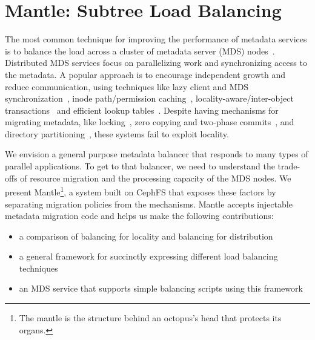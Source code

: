 \chapter{Mantle: Subtree Load Balancing}
\label{chp:mantle}

The most common technique for improving the performance of metadata services is
to balance the load across a cluster of metadata server (MDS)
nodes~\cite{patil:fast2011-giga+, weil:osdi2006-ceph, weil:sc2004-dyn-metadata,
sinnamohideen:atc2010-ursa, xing:sc2009-skyfs}.  Distributed MDS services focus
on parallelizing work and synchronizing access to the metadata. A popular
approach is to encourage independent growth and reduce communication, using
techniques like lazy client and MDS synchronization~\cite{patil:fast2011-giga+,
ren:sc2014-indexfs, zheng:pdsw2014-batchfs, hildebrand:msst2005-pnfs,
zhu:pds2008-hba}, inode path/permission caching~\cite{brandt:mss2003-lh,
li:msst2006-dynamic, xing:sc2009-skyfs}, locality-aware/inter-object
transactions~\cite{sinnamohideen:atc2010-ursa,zhu:pds2008-hba,ren:atc2013-tablefs,
ren:sc2014-indexfs} and efficient lookup tables~\cite{brandt:mss2003-lh,
zhu:pds2008-hba}. Despite having mechanisms for migrating metadata, like
locking~\cite{sinnamohideen:atc2010-ursa,schmuck:fast2002-gpfs}, zero copying
and two-phase commits~\cite{sinnamohideen:atc2010-ursa}, and directory
partitioning~\cite{xing:sc2009-skyfs, patil:fast2011-giga+, ren:sc2014-indexfs,
weil:osdi2006-ceph}, these systems fail to exploit locality.

We envision a general purpose metadata balancer that responds to many types of
parallel applications. To get to that balancer, we need to understand the
trade-offs of resource migration and the processing capacity of the MDS nodes.
We present Mantle\footnote{The mantle is the structure behind an octopus's head
that protects its organs.}, a system built on CephFS that exposes these factors
by separating migration policies from the mechanisms. Mantle accepts injectable
metadata migration code and helps us make the following contributions:

\begin{itemize}

    \item a comparison of balancing for locality and balancing for distribution

    \item a general framework for succinctly expressing different load
    balancing techniques 

    \item an MDS service that supports simple balancing scripts using this
    framework

\end{itemize}

